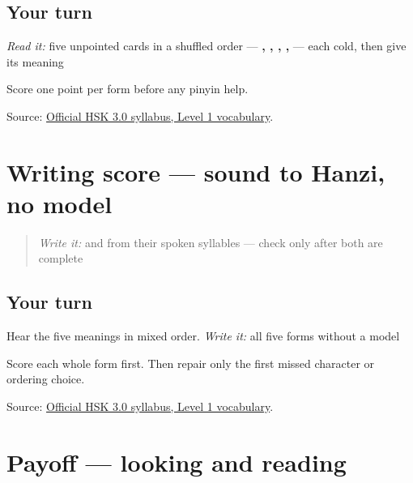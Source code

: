 \subsection*{Your turn}
\emph{Read it:} five unpointed cards in a shuffled order — \textbf{, , , , } — each cold, then give its meaning

Score one point per form before any pinyin help.

\begin{tcolorbox}[breakable,colback=teal!4,colframe=teal!35!black,title={Before you move on}]
Source: \href{https://hsk.cn-bj.ufileos.com/3.0/\%E6\%96\%B0\%E7\%89\%88HSK\%E8\%80\%83\%E8\%AF\%95\%E5\%A4\%A7\%E7\%BA\%B21219.pdf}{Official HSK 3.0 syllabus, Level 1 vocabulary}.
\end{tcolorbox}
\section[Practice]{Writing score — sound to Hanzi, no model}

\label{lesson:ZH-R18-writing-five}



\begin{quote}
\emph{Write it:}  and  from their spoken syllables — check only after both are complete
\end{quote}

\subsection*{Your turn}
Hear the five meanings in mixed order. \emph{Write it:} all five forms without a model

Score each whole form first. Then repair only the first missed character or ordering choice.

\begin{tcolorbox}[breakable,colback=teal!4,colframe=teal!35!black,title={Before you move on}]
Source: \href{https://hsk.cn-bj.ufileos.com/3.0/\%E6\%96\%B0\%E7\%89\%88HSK\%E8\%80\%83\%E8\%AF\%95\%E5\%A4\%A7\%E7\%BA\%B21219.pdf}{Official HSK 3.0 syllabus, Level 1 vocabulary}.
\end{tcolorbox}
\section[Practice]{Payoff — looking and reading}

\label{lesson:ZH-C18-practice}



